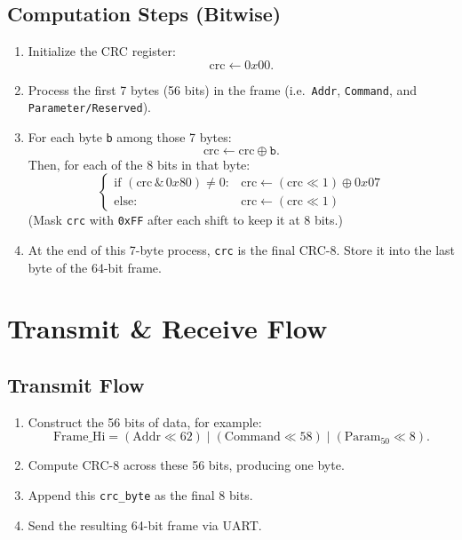 \documentclass[a4paper,11pt]{article}
\begin{document}
\newpage
\subsection{Computation Steps (Bitwise)}
\begin{enumerate}
  \item Initialize the CRC register:
    \[
      \text{crc} \gets 0x00.
    \]
  \item Process the first 7 bytes (56 bits) in the frame (i.e.\ \texttt{Addr}, \texttt{Command}, and \texttt{Parameter/Reserved}).
  \item For each byte \texttt{b} among those 7 bytes:
    \[
      \text{crc} \gets \text{crc} \oplus \texttt{b}.
    \]
    Then, for each of the 8 bits in that byte:
    \[
      \begin{cases}
        \text{if } (\text{crc} \,\&\, 0x80) \neq 0:
            & \text{crc} \gets (\text{crc} \ll 1) \oplus 0x07 \\
        \text{else}:
            & \text{crc} \gets (\text{crc} \ll 1)
      \end{cases}
    \]
    (Mask \texttt{crc} with \texttt{0xFF} after each shift to keep it at 8 bits.)

  \item At the end of this 7-byte process, \texttt{crc} is the final CRC-8. Store it into the last byte of the 64-bit frame.
\end{enumerate}

\section{Transmit \& Receive Flow}

\subsection{Transmit Flow}
\begin{enumerate}
  \item Construct the 56 bits of data, for example:
  \[
    \text{Frame\_Hi} = (\text{Addr} \ll 62)
                      \;\vert\; (\text{Command} \ll 58)
                      \;\vert\; (\text{Param}_{50} \ll 8).
  \]
  \item Compute CRC-8 across these 56 bits, producing one byte.
  \item Append this \texttt{crc\_byte} as the final 8 bits.
  \item Send the resulting 64-bit frame via UART.
\end{enumerate}
\end{document}
